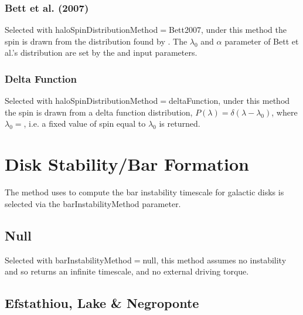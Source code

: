 \subsubsection{Bett et al. (2007)}\label{phys:haloSpinDistribution:haloSpinDistributionBett2007}

Selected with {\normalfont \ttfamily haloSpinDistributionMethod}$=${\normalfont \ttfamily Bett2007}, under this method the spin is drawn from the distribution found by \cite{bett_spin_2007}. The $\lambda_0$ and $\alpha$ parameter of Bett et al.'s distribution are set by the {\normalfont {}} and {\normalfont {}} input parameters.

\subsubsection{Delta Function}\label{phys:haloSpinDistribution:haloSpinDistributionDeltaFunction}

Selected with {\normalfont \ttfamily haloSpinDistributionMethod}$=${\normalfont \ttfamily deltaFunction}, under this method the spin is drawn from a delta function distribution, $P(\lambda) = \delta(\lambda-\lambda_0)$, where $\lambda_0=${\normalfont \ttfamily [deltaFunctionSpinDistributionSpin]}, i.e. a fixed value of spin equal to $\lambda_0$ is returned.

\section{Disk Stability/Bar Formation}\label{sec:DiskStability}

The method uses to compute the bar instability timescale for galactic disks is selected via the {\normalfont \ttfamily barInstabilityMethod} parameter.

\subsection{Null}

Selected with {\normalfont \ttfamily barInstabilityMethod}$=${\normalfont \ttfamily null}, this method assumes no instability and so returns an infinite timescale, and no external driving torque.

\subsection{Efstathiou, Lake \& Negroponte}

